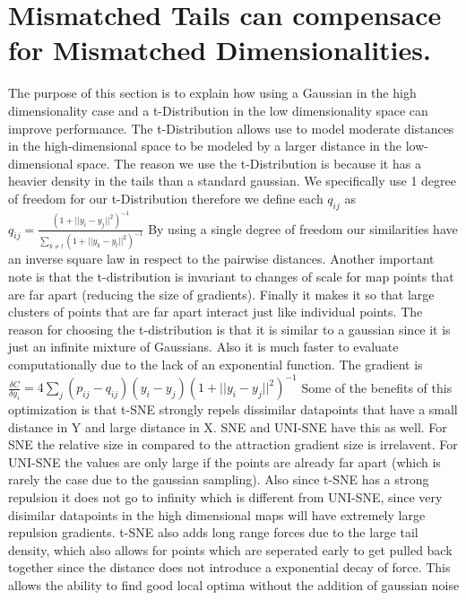\documentclass[11pt]{article}
\begin{document}
\section{Mismatched Tails can compensace for Mismatched Dimensionalities.}
\label{sec:org92190d5}
The purpose of this section is to explain how using a Gaussian in the high dimensionality case and a t-Distribution in the low dimensionality space can improve performance.
The t-Distribution allows use to model moderate distances in the high-dimensional space to be modeled by a larger distance in the low-dimensional space.
The reason we use the t-Distribution is because it has a heavier density in the tails than a standard gaussian.
We specifically use 1 degree of freedom for our t-Distribution
therefore we define each \(q_{ij}\) as
\(q_{ij} = \frac{(1+||y_i-y_j||^2)^{-1}}{\sum_{k \neq l}(1+||y_k - y_l||^2)^{-1}}\)
By using a single degree of freedom our similarities have an inverse square law in respect to the pairwise distances.
Another important note is that the t-distribution is invariant to changes of scale for map points that are far apart (reducing the size of gradients). Finally it makes it so that large clusters of points that are far apart interact just like individual points.
The reason for choosing the t-distribution is that it is similar to a gaussian since it is just an infinite mixture of Gaussians. Also it is much faster to evaluate computationally due to the lack of an exponential function.
The gradient is \(\frac{\delta C}{\delta y_i} = 4 \sum_j (p_{ij}-q_{ij}) (y_i-y_j) (1+||y_i-y_j||^2)^{-1}\)
Some of the benefits of this optimization is that t-SNE strongly repels dissimilar datapoints that have a small distance in Y and large distance in X.
SNE and UNI-SNE have this as well. For SNE the relative size in compared to the attraction gradient size is irrelavent. For UNI-SNE the values are only large if the points are already far apart (which is rarely the case due to the gaussian sampling).
Also since t-SNE has a strong repulsion it does not go to infinity which is different from UNI-SNE, since very disimilar datapoints in the high dimensional maps will have extremely large repulsion gradients.
t-SNE also adds long range forces due to the large tail density, which also allows for points which are seperated early to get pulled back together since the distance does not introduce a exponential decay of force.
This allows the ability to find good local optima without the addition of gaussian noise
\end{document}
